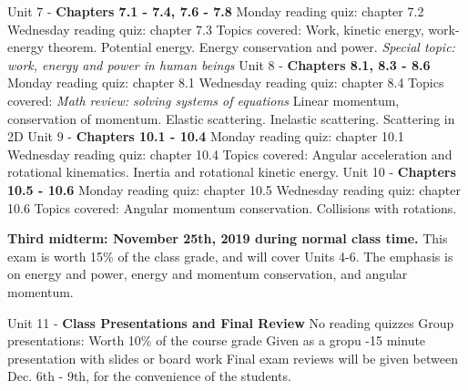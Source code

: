 \documentclass[10pt]{article}
\begin{document}
\begin{outline}[enumerate]
\1 Unit 7 - \textbf{Chapters 7.1 - 7.4, 7.6 - 7.8}
\2 Monday reading quiz: chapter 7.2
\2 Wednesday reading quiz: chapter 7.3
\2 Topics covered:
\3 Work, kinetic energy, work-energy theorem.
\3 Potential energy.
\3 Energy conservation and power.
\3 \textit{Special topic: work, energy and power in human beings}
\1 Unit 8 - \textbf{Chapters 8.1, 8.3 - 8.6}
\2 Monday reading quiz: chapter 8.1
\2 Wednesday reading quiz: chapter 8.4
\2 Topics covered:
\3 \textit{Math review: solving systems of equations}
\3 Linear momentum, conservation of momentum.
\3 Elastic scattering.
\3 Inelastic scattering.
\3 Scattering in 2D
\1 Unit 9 - \textbf{Chapters 10.1 - 10.4}
\2 Monday reading quiz: chapter 10.1
\2 Wednesday reading quiz: chapter 10.4
\2 Topics covered:
\3 Angular acceleration and rotational kinematics.
\3 Inertia and rotational kinetic energy.
\1 Unit 10 - \textbf{Chapters 10.5 - 10.6}
\2 Monday reading quiz: chapter 10.5
\2 Wednesday reading quiz: chapter 10.6
\2 Topics covered:
\3 Angular momentum conservation.
\3 Collisions with rotations.

\1 \textbf{Third midterm: November 25th, 2019 during normal class time.} This exam is worth 15\% of the class grade, and will cover Units 4-6.  The emphasis is on energy and power, energy and momentum conservation, and angular momentum.

\1 Unit 11 - \textbf{Class Presentations and Final Review}
\2 No reading quizzes
\2 Group presentations:
\3 Worth 10\% of the course grade
\3 Given as a gropu
-15 minute presentation with slides or board work
\2 Final exam reviews will be given between Dec. 6th - 9th, for the convenience of the students.
\end{outline}
\end{document}
